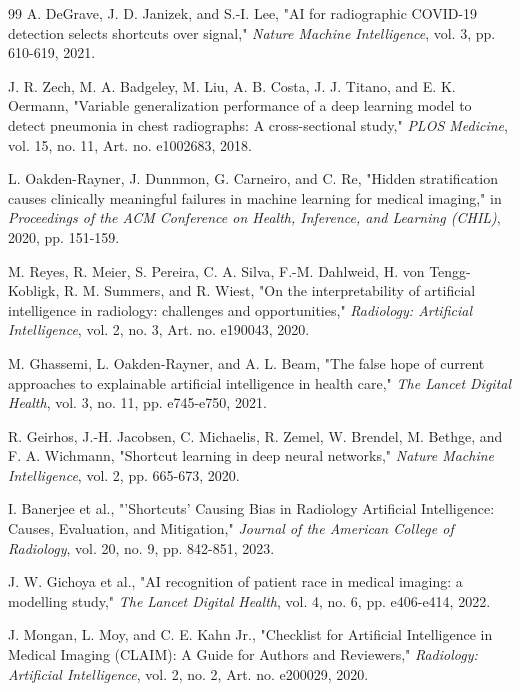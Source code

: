 \begin{thebibliography}{99}
 A. DeGrave, J. D. Janizek, and S.-I. Lee, "AI for radiographic COVID-19 detection selects shortcuts over signal," \emph{Nature Machine Intelligence}, vol. 3, pp. 610-619, 2021.

 J. R. Zech, M. A. Badgeley, M. Liu, A. B. Costa, J. J. Titano, and E. K. Oermann, "Variable generalization performance of a deep learning model to detect pneumonia in chest radiographs: A cross-sectional study," \emph{PLOS Medicine}, vol. 15, no. 11, Art. no. e1002683, 2018.

 L. Oakden-Rayner, J. Dunnmon, G. Carneiro, and C. Re, "Hidden stratification causes clinically meaningful failures in machine learning for medical imaging," in \emph{Proceedings of the ACM Conference on Health, Inference, and Learning (CHIL)}, 2020, pp. 151-159.

 M. Reyes, R. Meier, S. Pereira, C. A. Silva, F.-M. Dahlweid, H. von Tengg-Kobligk, R. M. Summers, and R. Wiest, "On the interpretability of artificial intelligence in radiology: challenges and opportunities," \emph{Radiology: Artificial Intelligence}, vol. 2, no. 3, Art. no. e190043, 2020.

 M. Ghassemi, L. Oakden-Rayner, and A. L. Beam, "The false hope of current approaches to explainable artificial intelligence in health care," \emph{The Lancet Digital Health}, vol. 3, no. 11, pp. e745-e750, 2021.

 R. Geirhos, J.-H. Jacobsen, C. Michaelis, R. Zemel, W. Brendel, M. Bethge, and F. A. Wichmann, "Shortcut learning in deep neural networks," \emph{Nature Machine Intelligence}, vol. 2, pp. 665-673, 2020.

 I. Banerjee et al., "'Shortcuts' Causing Bias in Radiology Artificial Intelligence: Causes, Evaluation, and Mitigation," \emph{Journal of the American College of Radiology}, vol. 20, no. 9, pp. 842-851, 2023.

 J. W. Gichoya et al., "AI recognition of patient race in medical imaging: a modelling study," \emph{The Lancet Digital Health}, vol. 4, no. 6, pp. e406-e414, 2022.

 J. Mongan, L. Moy, and C. E. Kahn Jr., "Checklist for Artificial Intelligence in Medical Imaging (CLAIM): A Guide for Authors and Reviewers," \emph{Radiology: Artificial Intelligence}, vol. 2, no. 2, Art. no. e200029, 2020.


\end{thebibliography}

